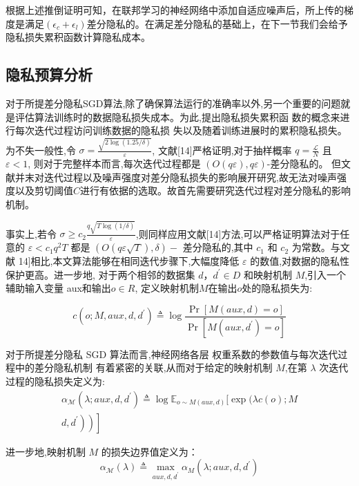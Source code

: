 根据上述推倒证明可知，在联邦学习的神经网络中添加自适应噪声后，所上传的梯度是满足$\left(\epsilon_{c}+\epsilon_{l}\right)$差分隐私的。在满足差分隐私的基础上，在下一节我们会给予隐私损失累积函数计算隐私成本。

\subsection{隐私预算分析}
对于所提差分隐私SGD算法,除了确保算法运行的准确率以外,另一个重要的问题就是评估算法训练时的数据隐私损失成本。为此,提出隐私损失累积函 数的概念来进行每次迭代过程访问训练数据的隐私损 失以及随着训练进展时的累积隐私损失。
为不失一般性,令 $\sigma=\frac{\sqrt{2 \log (1.25 / \delta)}}{\varepsilon}$, 文献[14]严格证明,对于抽样概率 $q=\frac{\mathcal{L}}{N}$ 且 $\varepsilon<1$, 则对于完整样本而言,每次迭代过程都是 $(O(q \varepsilon), q \varepsilon)$-差分隐私的。 但文献并末对迭代过程以及噪声强度对差分隐私损失的影响展开研究,故无法对噪声强度以及剪切阈值$C$进行有依据的选取。故首先需要研究迭代过程对差分隐私的影响机制。

事实上,若令 $\sigma \geqslant c_{2} \frac{q \sqrt{T \log (1 / \delta)}}{\varepsilon}$,则同样应用文献[14]方法,可以严格证明算法对于任意的 $\varepsilon<c_{1} q^{2} T$ 都是 $(O(q \varepsilon \sqrt{T}), \delta)-$ 差分隐私的,其中 $c_{1}$ 和 $c_{2}$ 为常数。与文献 14]相比,本文算法能够在相同迭代步骤下,大幅度降低 $\varepsilon$ 的数值,对数据的隐私性保护更高。进一步地, 对于两个相邻的数据集 $d$，$d^{\prime} \in D$ 和映射机制 $M$,引入一个辅助输入变量 aux和输出$o \in R$, 定义映射机制$M$在输出$o$处的隐私损失为:

$$
c\left(o ; M, a u x, d, d^{\prime}\right) \triangleq \log \frac{\operatorname{Pr}[M(a u x, d)=o]}{\operatorname{Pr}\left[M\left(a u x, d^{\prime}\right)=o\right]}
$$

对于所提差分隐私 SGD 算法而言,神经网络各层 权重系数的参数值与每次迭代过程中的差分隐私机制 有着紧密的关联,从而对于给定的映射机制 $M$,在第 $\lambda$ 次迭代过程的隐私损失定义为:
\begin{equation}\label{eq:隐私损失定义}
\begin{array}{r}
\alpha_{\mathcal{M}}\left(\lambda ; a u x, d, d^{\prime}\right) \triangleq \log \mathbb{E}_{o \sim M(a u x, d)}[\exp (\lambda c(o) ; M \\
\left.\left.\left.d, d^{\prime}\right)\right)\right]
\end{array}
\end{equation}

进一步地,映射机制 $M$ 的损失边界值定义为：
\begin{equation}\label{eq:损失边界值定义}
\alpha_{\mathcal{M}}(\lambda) \triangleq \max _{a u x, d, d^{\prime}} \alpha_{M}\left(\lambda ; a u x, d, d^{\prime}\right)
\end{equation}

